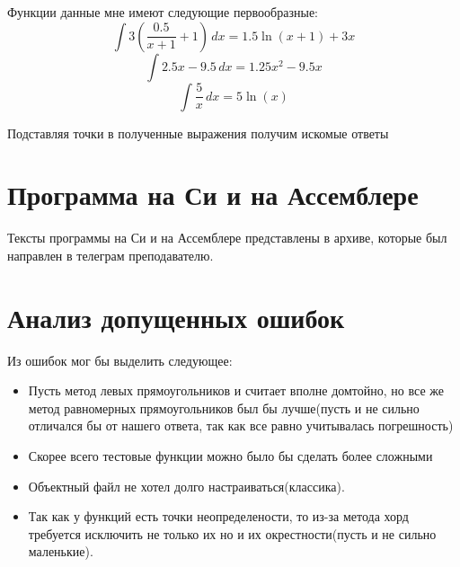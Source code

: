 \documentclass[a4paper,12pt,titlepage,finall]{article}
\begin{document}
Функции данные мне имеют следующие первообразные:
\begin{equation}
    \int 3\left(\frac{0.5}{x+1} + 1\right) \, dx = 1.5\ln (x+1) + 3x
\end{equation}
\begin{equation}
    \int 2.5x-9.5 \, dx = 1.25x^2 - 9.5x
\end{equation}
\begin{equation}
    \int \frac{5}{x} \, dx = 5\ln(x)
\end{equation}

Подставляя точки в полученные выражения получим искомые ответы

\newpage

\section{Программа на Си и на Ассемблере}

Тексты программы на Си и на Ассемблере представлены в архиве, которые был направлен в телеграм преподавателю.

\newpage

\section{Анализ допущенных ошибок}

Из ошибок мог бы выделить следующее:
\begin{itemize} 
    \item Пусть метод левых прямоугольников и считает вполне домтойно, 
    но все же метод равномерных прямоугольников был бы лучше(пусть и не
    сильно отличался бы от нашего ответа, так как все равно учитывалась погрешность)
    \item Скорее всего тестовые функции можно было бы сделать более сложными
    \item Объектный файл не хотел долго настраиваться(классика).
    \item Так как у функций есть точки неопределености, то из-за метода хорд
    требуется исключить не только их но и их окрестности(пусть и не сильно маленькие).
\end{itemize}
\end{document}
